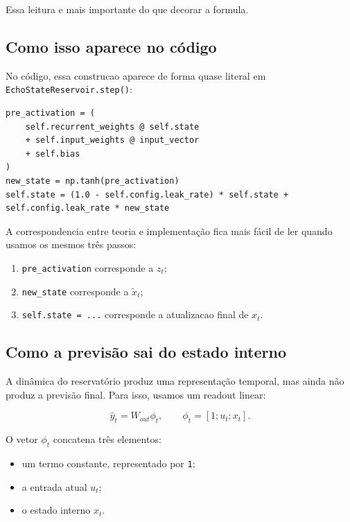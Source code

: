 \documentclass[12pt]{article}
\providecommand{\tightlist}{%
  \setlength{\itemsep}{0pt}\setlength{\parskip}{0pt}}
\begin{document}
Essa leitura e mais importante do que decorar a formula.

\subsection{Como isso aparece no código}\label{38-como-isso-aparece-no-cuxf3digo}

No código, essa construcao aparece de forma quase literal em \texttt{EchoStateReservoir.step()}:

\begin{verbatim}
pre_activation = (
    self.recurrent_weights @ self.state
    + self.input_weights @ input_vector
    + self.bias
)
new_state = np.tanh(pre_activation)
self.state = (1.0 - self.config.leak_rate) * self.state + self.config.leak_rate * new_state
\end{verbatim}

A correspondencia entre teoria e implementação fica mais fácil de ler quando usamos os mesmos três passos:

\begin{enumerate}
\def\labelenumi{\arabic{enumi}.}
\tightlist
\item
  \texttt{pre\_activation} corresponde a \(z_t\);
\item
  \texttt{new\_state} corresponde a \(\widetilde{x}_t\);
\item
  \texttt{self.state\ =\ ...} corresponde a atualizacao final de \(x_t\).
\end{enumerate}

\subsection{Como a previsão sai do estado interno}\label{39-como-a-previsuxe3o-sai-do-estado-interno}

A dinâmica do reservatório produz uma representação temporal, mas ainda não produz a previsão final. Para isso, usamos um readout linear:

\[
\hat{y}_t = W_{out} \phi_t,
\qquad
\phi_t = [1; u_t; x_t].
\]

O vetor \(\phi_t\) concatena três elementos:

\begin{itemize}
\tightlist
\item
  um termo constante, representado por \texttt{1};
\item
  a entrada atual \(u_t\);
\item
  o estado interno \(x_t\).
\end{itemize}
\end{document}
